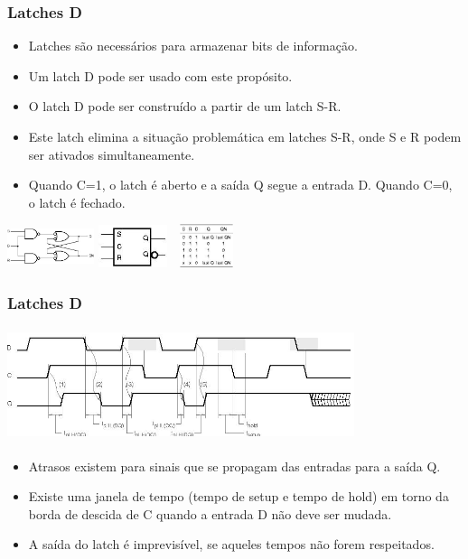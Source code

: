 \documentclass{beamer}
\begin{document}
\begin{frame}
  \frametitle{Latches D}
 \begin{itemize}
  \item Latches são necessários para armazenar bits de informação.\pause
  \item Um latch D pode ser usado com este  propósito.\pause
  \item O latch D pode ser construído a partir de um latch S-R.\pause
  \item Este latch elimina a situação problemática em latches S-R, onde S e R podem ser ativados simultaneamente.\pause
  \item Quando C=1, o latch é aberto e a saída Q segue a entrada D. Quando C=0, o latch é fechado.
 \end{itemize}
 \begin{center}
  \includegraphics[height = 0.5in, width = 1in]{slide19_filomeno} 
  \includegraphics[height = 0.5in, width = 0.8in]{slide19_filomeno2} 
  \includegraphics[height = 0.5in, width = 0.8in]{slide19_filomeno3} 
 \end{center}
\end{frame}

\begin{frame}
  \frametitle{Latches D}
 \begin{center}
  \includegraphics[height = 1.3in, width = 4in]{slide10_filomeno}
 \end{center}
 \begin{itemize}
  \item Atrasos existem para sinais que se propagam das entradas para a saída Q.\pause
  \item Existe uma janela de tempo (tempo de setup e tempo de hold) em  torno da borda de descida de C quando a entrada D não deve ser mudada.\pause
  \item A saída do latch é imprevisível, se aqueles tempos não forem respeitados.
 \end{itemize}
\end{frame}
\end{document}

